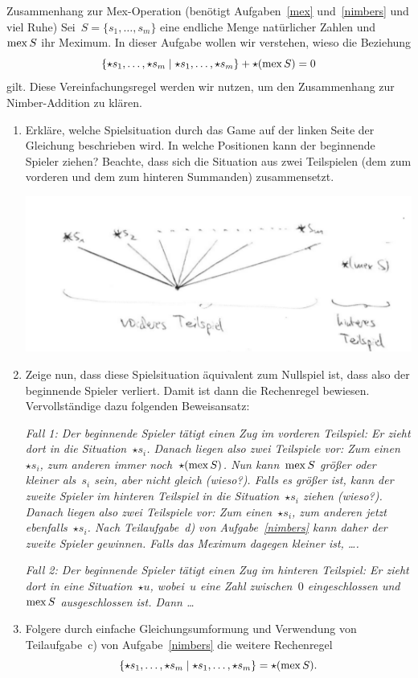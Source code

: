 \documentclass{../zirkelblatt}
\begin{document}
\begin{aufgabe}{Zusammenhang zur Mex-Operation (benötigt Aufgaben~\ref{mex}
und~\ref{nimbers} und viel Ruhe)}
\label{zusammenhang-mex}
Sei~$S = \{ s_1,\ldots,s_m \}$ eine endliche Menge natürlicher Zahlen und~$\operatorname{mex}
S$ ihr Meximum. In dieser Aufgabe wollen wir verstehen, wieso die Beziehung
\[ \{ \star s_1,\ldots,\star s_m \mathrel{|} \star s_1,\ldots,\star s_m \} + \star(\operatorname{mex} S)
= 0
\]
gilt. Diese Vereinfachungsregel werden wir nutzen, um den Zusammenhang zur
Nimber-Addition zu klären.
\begin{enumerate}
\item Erkläre, welche Spielsituation durch das Game auf der linken Seite der
Gleichung beschrieben wird. In welche Positionen kann der beginnende Spieler
ziehen? Beachte, dass sich die Situation aus zwei Teilspielen (dem zum vorderen
und dem zum hinteren Summanden) zusammensetzt.
\begin{center}
\includegraphics[scale=0.6]{rechenregel-mex}
\end{center}
\item Zeige nun, dass diese Spielsituation äquivalent zum Nullspiel ist, dass
also der beginnende Spieler verliert. Damit ist dann die Rechenregel bewiesen.
Vervollständige dazu folgenden Beweisansatz:

\emph{Fall 1: Der beginnende Spieler tätigt einen Zug im vorderen Teilspiel: Er
zieht dort in die Situation~$\star s_i$. Danach liegen also zwei Teilspiele
vor: Zum einen~$\star s_i$, zum anderen immer noch~$\star(\operatorname{mex} S)$. Nun
kann~$\operatorname{mex} S$ größer oder kleiner als~$s_i$ sein, aber nicht gleich (wieso?).
Falls es größer ist, kann der zweite Spieler im hinteren Teilspiel in die
Situation~$\star s_i$ ziehen (wieso?). Danach liegen also zwei Teilspiele vor:
Zum einen~$\star s_i$, zum anderen jetzt ebenfalls~$\star s_i$. Nach
Teilaufgabe~d) von Aufgabe~\ref{nimbers} kann daher der zweite Spieler
gewinnen. Falls das Meximum dagegen kleiner ist, \ldots.}

\emph{Fall 2: Der beginnende Spieler tätigt einen Zug im hinteren Teilspiel:
Er zieht dort in eine Situation~$\star u$, wobei~$u$ eine Zahl zwischen~$0$
eingeschlossen und~$\operatorname{mex} S$ ausgeschlossen ist. Dann \ldots}
\item Folgere durch einfache Gleichungsumformung und Verwendung von
Teilaufgabe~c) von Aufgabe~\ref{nimbers} die weitere Rechenregel
\[ \{ \star s_1,\ldots,\star s_m \mathrel{|} \star s_1,\ldots,\star s_m \} = \star(\operatorname{mex}
S). \]
\end{enumerate}
\end{aufgabe}
\end{document}

